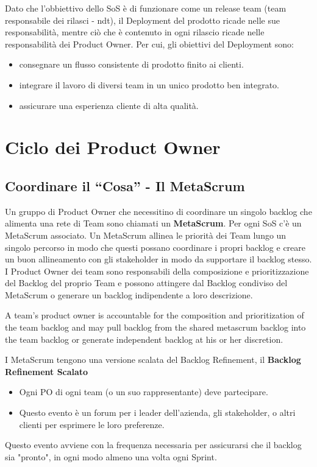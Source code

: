 \documentclass[12pt,a4paper,parskip=full]{scrartcl}
\begin{document}
Dato che l'obbiettivo dello SoS è di funzionare come un release team (team responsabile dei rilasci - ndt), il Deployment del prodotto ricade nelle sue responsabilità, mentre ciò che è contenuto in ogni rilascio ricade nelle responsabilità dei Product Owner. Per cui, gli obiettivi del Deployment sono:
\begin{itemize}
\item consegnare un flusso consistente di prodotto finito ai clienti.
\item integrare il lavoro di diversi team in un unico prodotto ben integrato.
\item assicurare una esperienza cliente di alta qualità.
\end{itemize}

\section{Ciclo dei Product Owner}
\subsection{Coordinare il ``Cosa'' - Il MetaScrum}
Un gruppo di Product Owner che necessitino di coordinare un singolo backlog che alimenta una rete di Team sono chiamati un \textbf{MetaScrum}. Per ogni SoS c'è un MetaScrum associato. Un MetaScrum allinea le priorità dei Team lungo un singolo percorso in modo che questi possano coordinare i propri backlog e creare un buon allineamento con gli stakeholder in modo da supportare il backlog stesso. I Product Owner dei team sono responsabili della composizione e prioritizzazione del Backlog del proprio Team e possono attingere dal Backlog condiviso del MetaScrum o generare un backlog indipendente a loro descrizione.

A team's product owner is accountable for the composition and prioritization of the team backlog and may pull backlog from the shared metascrum backlog into the team backlog or generate independent backlog at his or her discretion.

I MetaScrum tengono una versione scalata del Backlog Refinement, il \textbf{Backlog Refinement Scalato} 
\begin{itemize}
\item Ogni PO di ogni team (o un suo rappresentante) deve partecipare.
\item Questo evento è un forum per i leader dell'azienda, gli stakeholder, o altri clienti per esprimere le loro preferenze.
\end{itemize}
Questo evento avviene con la frequenza necessaria per assicurarsi che il backlog sia "pronto", in ogni modo almeno una volta ogni Sprint.
\end{document}

